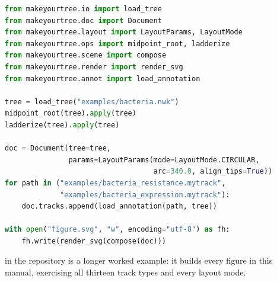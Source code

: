 \begin{lstlisting}[language=Python]
from makeyourtree.io import load_tree
from makeyourtree.doc import Document
from makeyourtree.layout import LayoutParams, LayoutMode
from makeyourtree.ops import midpoint_root, ladderize
from makeyourtree.scene import compose
from makeyourtree.render import render_svg
from makeyourtree.annot import load_annotation

tree = load_tree("examples/bacteria.nwk")
midpoint_root(tree).apply(tree)
ladderize(tree).apply(tree)

doc = Document(tree=tree,
               params=LayoutParams(mode=LayoutMode.CIRCULAR,
                                   arc=340.0, align_tips=True))
for path in ("examples/bacteria_resistance.mytrack",
             "examples/bacteria_expression.mytrack"):
    doc.tracks.append(load_annotation(path, tree))

with open("figure.svg", "w", encoding="utf-8") as fh:
    fh.write(render_svg(compose(doc)))
\end{lstlisting}

 in the repository is a longer worked example: it
builds every figure in this manual, exercising all thirteen track types and every
layout mode.
